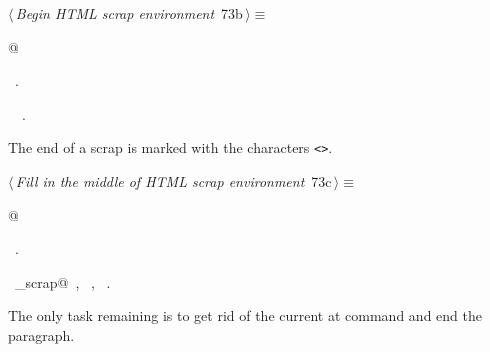 \documentclass[a4paper]{report}
\begin{document}
\begin{flushleft} \small
\begin{minipage}{\linewidth}\label{scrap144}\raggedright\small
{} $\langle\,${\it Begin HTML scrap environment}\nobreak\ {\footnotesize {73b}}$\,\rangle\equiv$
\vspace{-1ex}
\begin{list}{}{} \item
\mbox{}@{\NWsep}
\end{list}
\vspace{-1.5ex}
\footnotesize
\begin{list}{}{\setlength{\itemsep}{-\parsep}\setlength{\itemindent}{-\leftmargin}}
\item \NWtxtMacroRefIn\ .
\item \NWtxtIdentsUsed\nobreak\  \verb@fputs@\nobreak\ .
\item{}
\end{list}
\end{minipage}\vspace{4ex}
\end{flushleft}
The end of a scrap is marked with the characters \verb|<>|.
\begin{flushleft} \small
\begin{minipage}{\linewidth}\label{scrap145}\raggedright\small
{} $\langle\,${\it Fill in the middle of HTML scrap environment}\nobreak\ {\footnotesize {73c}}$\,\rangle\equiv$
\vspace{-1ex}
\begin{list}{}{} \item
\mbox{}@{\NWsep}
\end{list}
\vspace{-1.5ex}
\footnotesize
\begin{list}{}{\setlength{\itemsep}{-\parsep}\setlength{\itemindent}{-\leftmargin}}
\item \NWtxtMacroRefIn\ .
\item \NWtxtIdentsUsed\nobreak\  \verb@copy_scrap@\nobreak\ , \verb@fputs@\nobreak\ , \verb@TRUE@\nobreak\ .
\item{}
\end{list}
\end{minipage}\vspace{4ex}
\end{flushleft}
The only task remaining is to get rid of the current at command and
end the paragraph.
\end{document}
